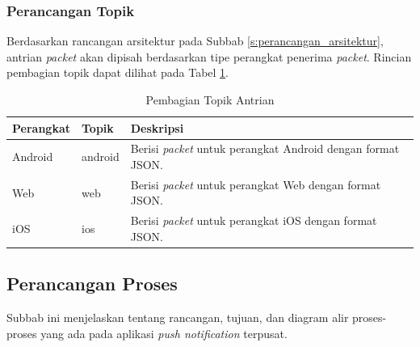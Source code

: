 \subsubsection{Perancangan Topik}
\par Berdasarkan rancangan arsitektur pada Subbab \ref{s:perancangan_arsitektur}, antrian \textit{packet} akan dipisah berdasarkan tipe perangkat penerima \textit{packet}. Rincian pembagian topik dapat dilihat pada Tabel \ref{t:pembagian_topik_antrian}.
\begin{longtable}{|p{2cm}|p{2cm}|p{5cm}|}
	\caption{Pembagian Topik Antrian} \label{t:pembagian_topik_antrian} \\ \hline
	\rowcolor{lightgray} Perangkat & Topik & Deskripsi \\ \hline
	Android & android & Berisi \textit{packet} untuk perangkat Android dengan format JSON. \\ \hline
	Web & web & Berisi \textit{packet} untuk perangkat Web dengan format JSON. \\ \hline
	iOS & ios & Berisi \textit{packet} untuk perangkat iOS dengan format JSON. \\ \hline
\end{longtable}

\subsection{Perancangan Proses}
\par Subbab ini menjelaskan tentang rancangan, tujuan, dan diagram alir proses-proses yang ada pada aplikasi \textit{push notification} terpusat.

